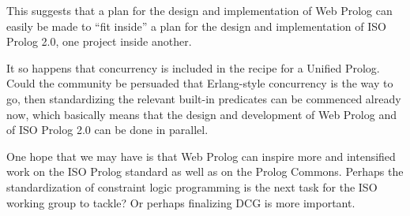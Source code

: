 This suggests that a plan for the design and implementation of Web Prolog can easily be made to ``fit inside'' a plan for the design and implementation of ISO Prolog 2.0, one project inside another.

It so happens that concurrency is included in the recipe for a Unified Prolog. Could the community be persuaded that Erlang-style concurrency is the way to go, then standardizing the relevant built-in predicates can be commenced already now, which basically means that the design and development of Web Prolog and of ISO Prolog 2.0 can be done in parallel.


One hope that we may have is that Web Prolog can inspire more and intensified work on the ISO Prolog standard as well as on the Prolog Commons. Perhaps the standardization of constraint logic programming is the next task for the ISO working group to tackle? Or perhaps finalizing DCG is more important.
